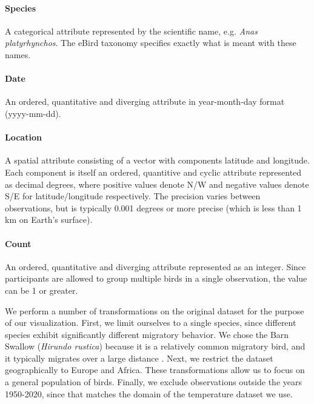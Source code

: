 \documentclass[journal]{vgtc}                %
\begin{document}
\paragraph{Species} A categorical attribute represented by the scientific name, e.g. \textit{Anas platyrhynchos}. The eBird taxonomy\cite{ebird2019taxonomy} specifies exactly what is meant with these names.

\paragraph{Date} An ordered, quantitative and diverging attribute in year-month-day format (yyyy-mm-dd).

\paragraph{Location} A spatial attribute consisting of a vector with components latitude and longitude. Each component is itself an ordered, quantitive and cyclic attribute represented as decimal degrees, where positive values denote N/W and negative values denote S/E for latitude/longitude respectively. The precision varies between observations, but is typically 0.001 degrees or more precise (which is less than 1 km on Earth's surface).

\paragraph{Count} An ordered, quantitative and diverging attribute represented as an integer. Since participants are allowed to group multiple birds in a single observation, the value can be 1 or greater.

\vspace{2mm}

We perform a number of transformations on the original dataset for the purpose of our visualization. First, we limit ourselves to a single species, since different species exhibit significantly different migratory behavior. We chose the Barn Swallow (\emph{Hirundo rustica}) because it is a relatively common migratory bird, and it typically migrates over a large distance \cite{turner1989swallow}. Next, we restrict the dataset geographically to Europe and Africa. These transformations allow us to focus on a general population of birds. Finally, we exclude observations outside the years 1950-2020, since that matches the domain of the temperature dataset we use.

\vspace{2mm}
\end{document}
